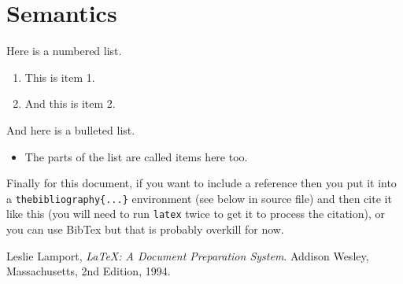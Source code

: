 \documentclass[a4wide, 11pt]{article}
\begin{document}
\section{Semantics}

Here is a numbered list.

\begin{enumerate}

    \item
    This is item 1.
    
    \item
    And this is item 2.
    
\end{enumerate}

And here is a bulleted list.

\begin{itemize}

    \item
    The parts of the list are called items here too.
    
\end{itemize}

Finally for this document, if you want to include a reference
then you put it into a \texttt{thebibliography\{...\}}
environment (see below in source file) and then 
cite it like this \cite{lamport94}
(you will need to run \texttt{latex} twice to get it to process the citation),
or you can use BibTex but that is probably overkill for now.

\begin{thebibliography}{9}

  Leslie Lamport,
  \emph{\LaTeX: A Document Preparation System}.
  Addison Wesley, Massachusetts,
  2nd Edition,
  1994.

\end{thebibliography}
\end{document}
